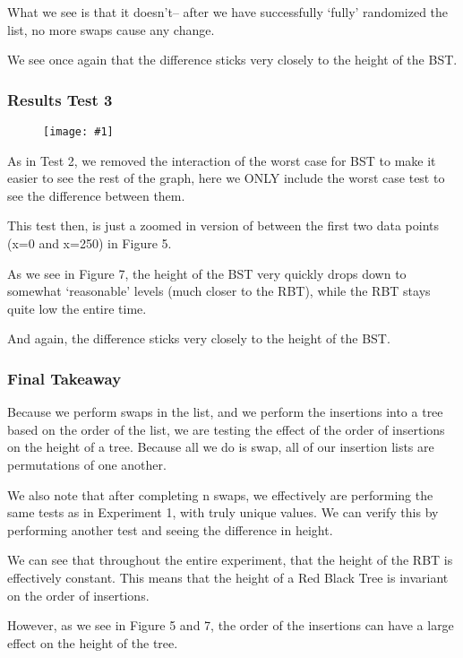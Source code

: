 \documentclass{article}
\newcommand{\figureInsetScaled}[3]
{
    \FloatBarrier{}
    \figureRaw{#1}{#2}{#3}
    \FloatBarrier{}
}
\newcommand{\figureRaw}[3]
{
    \begin{figure}[ht!]
        \centering
        \texttt{[image: \#1]}
        \caption{#2}
    \end{figure}
}
\begin{document}
What we see is that it doesn't-- after we have successfully `fully' randomized the list, no more swaps cause any change.

We see once again that the difference sticks very closely to the height of the BST.

\subsubsection{Results Test 3}
\figureInsetScaled{images/experiment2/Figure_3.png}{}{0.5}

As in Test 2, we removed the interaction of the worst case for BST to make it easier to see the rest of the graph, here we ONLY include the worst case test to see the difference between them.

This test then, is just a zoomed in version of between the first two data points (x=0 and x=250) in Figure 5.

As we see in Figure 7, the height of the BST very quickly drops down to somewhat `reasonable' levels (much closer to the RBT), while the RBT stays quite low the entire time. 

And again, the difference sticks very closely to the height of the BST.

\subsubsection{Final Takeaway}

Because we perform swaps in the list, and we perform the insertions into a tree based on the order of the list, we are testing the effect of the order of insertions on the height of a tree. Because all we do is swap, all of our insertion lists are permutations of one another.

We also note that after completing n swaps, we effectively are performing the same tests as in Experiment 1, with truly unique values. We can verify this by performing another test and seeing the difference in height.

We can see that throughout the entire experiment, that the height of the RBT is effectively constant. This means that the height of a Red Black Tree is invariant on the order of insertions.

However, as we see in Figure 5 and 7, the order of the insertions can have a large effect on the height of the tree.

\end{document}
